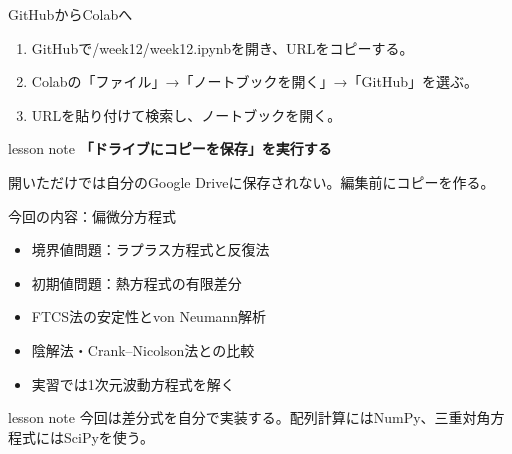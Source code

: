 \documentclass[12pt,aspectratio=43]{beamer}
\newcommand{\code}[1]{{\codefont #1}}
\newenvironment{lessonbox}
  {\begin{beamercolorbox}[wd=\linewidth,sep=1.5mm]{lesson note}}
  {\end{beamercolorbox}\par}
\begin{document}
\begin{frame}[t]{GitHubからColabへ}
  \begin{enumerate}
    \setlength{\itemsep}{4mm}
    \item GitHubで\code{2026/week12/week12.ipynb}を開き、URLをコピーする。
    \item Colabの「ファイル」→「ノートブックを開く」→「GitHub」を選ぶ。
    \item URLを貼り付けて検索し、ノートブックを開く。
  \end{enumerate}
  \vspace{3mm}
  \begin{lessonbox}
    \textbf{「ドライブにコピーを保存」を実行する}\par
    \small 開いただけでは自分のGoogle Driveに保存されない。編集前にコピーを作る。
  \end{lessonbox}
\end{frame}

\begin{frame}[t]{今回の内容：偏微分方程式}
  \begin{itemize}
    \setlength{\itemsep}{3mm}
    \item 境界値問題：ラプラス方程式と反復法
    \item 初期値問題：熱方程式の有限差分
    \item FTCS法の安定性とvon Neumann解析
    \item 陰解法・Crank--Nicolson法との比較
    \item 実習では1次元波動方程式を解く
  \end{itemize}
  \vfill
  \begin{lessonbox}
    今回は差分式を自分で実装する。配列計算にはNumPy、三重対角方程式にはSciPyを使う。
  \end{lessonbox}
\end{frame}
\end{document}
